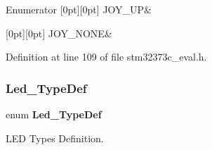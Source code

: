 \begin{DoxyEnumFields}{Enumerator}
[0pt][0pt]{}\mbox{\label{group___exported___types_gga7466d9ae142b713772373c9ddfc90332a05f25880b9a9ec098379c1f6be742682}} 
J\+O\+Y\+\_\+\+UP&\\
\hline

[0pt][0pt]{}\mbox{\label{group___exported___types_gga7466d9ae142b713772373c9ddfc90332a310776ae6ccdcf448ef29f9ba115e9d8}} 
J\+O\+Y\+\_\+\+N\+O\+NE&\\
\hline

\end{DoxyEnumFields}


Definition at line 109 of file stm32373c\+\_\+eval.\+h.

\mbox{\label{group___exported___types_gaa059704b7ca945eb9c1e7f2c3d03fecd}} 
\subsubsection{Led\+\_\+\+Type\+Def}
{\footnotesize\ttfamily enum \textbf{ Led\+\_\+\+Type\+Def}}



L\+ED Types Definition. 

